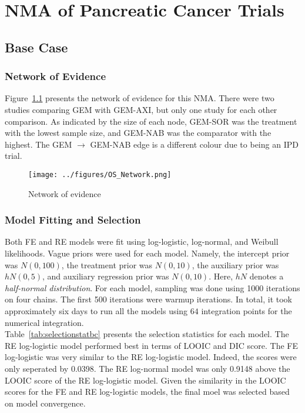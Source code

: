 \chapter{NMA of Pancreatic Cancer Trials}\label{nmachap}

\section{Base Case}
\subsection{Network of Evidence}
Figure~\ref{fig:osnet} presents the network of evidence for this NMA. There were two studies comparing GEM with GEM-AXI, but only one study for each other comparison. As indicated by the size of each node, GEM-SOR was the treatment with the lowest sample size, and GEM-NAB was the comparator with the highest. The GEM $\to$ GEM-NAB edge is a different colour due to being an IPD trial. 

\begin{figure}[h]
    \centering
    \texttt{[image: ../figures/OS\_Network.png]}
    \caption{Network of evidence}
    \label{fig:osnet}
\end{figure}

\subsection{Model Fitting and Selection}
Both FE and RE models were fit using log-logistic, log-normal, and Weibull likelihoods. Vague priors were used for each model. Namely, the intercept prior was $N(0, 100)$, the treatment prior was $N(0, 10)$, the auxiliary prior was $hN(0, 5)$, and auxiliary regression prior was $N(0, 10)$. Here, $hN$ denotes a \textit{half-normal distribution}. For each model, sampling was done using 1000 iterations on four chains. The first 500 iterations were warmup iterations. In total, it took approximately six days to run all the models using $64$ integration points for the numerical integration.\\

Table~\ref{tab:selectionstatbc} presents the selection statistics for each model. The RE log-logistic model performed best in terms of LOOIC and DIC score. The FE log-logistic was very similar to the RE log-logistic model. Indeed, the scores were only seperated by 0.0398. The RE log-normal model was only 0.9148 above the LOOIC score of the RE log-logistic model. Given the similarity in the LOOIC scores for the FE and RE log-logistic models, the final moel was selected based on model convergence. \\

